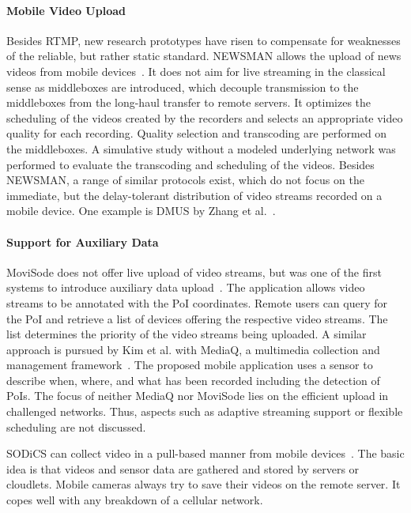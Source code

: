 \paragraph{Mobile Video Upload}
Besides \ac{RTMP}, new research prototypes have risen to compensate for weaknesses of the reliable, but rather static standard.
NEWSMAN allows the upload of news videos from mobile devices~\cite{Shah2016}.
It does not aim for live streaming in the classical sense as middleboxes are introduced, which decouple transmission to the middleboxes from the long-haul transfer to remote servers.
It optimizes the scheduling of the videos created by the recorders and selects an appropriate video quality for each recording.
Quality selection and transcoding are performed on the middleboxes.
A simulative study without a modeled underlying network was performed to evaluate the transcoding and scheduling of the videos.
Besides NEWSMAN, a range of similar protocols exist, which do not focus on the immediate, but the delay-tolerant distribution of video streams recorded on a mobile device.
One example is DMUS by Zhang et al.~\cite{Zhang2008}.
\paragraph{Support for Auxiliary Data}
MoviSode does not offer live upload of video streams, but was one of the first systems to introduce auxiliary data upload~\cite{Seshadri2015}. 
The application allows video streams to be annotated with the \ac{PoI} coordinates. 
Remote users can query for the \ac{PoI} and retrieve a list of devices offering the respective video streams.
The list determines the priority of the video streams being uploaded.
A similar approach is pursued by Kim et al. with MediaQ, a multimedia collection and management framework~\cite{Kim2014}.
The proposed mobile application uses a sensor to describe when, where, and what has been recorded including the detection of \ac{PoI}s.
The focus of neither MediaQ nor MoviSode lies on the efficient upload in challenged networks. 
Thus, aspects such as adaptive streaming support or flexible scheduling are not discussed. 

SODiCS can collect video in a pull-based manner from mobile devices~\cite{Ito2014}. 
The basic idea is that videos and sensor data are gathered and stored by servers or cloudlets.
Mobile cameras always try to save their videos on the remote server.
It copes well with any breakdown of a cellular network. %
